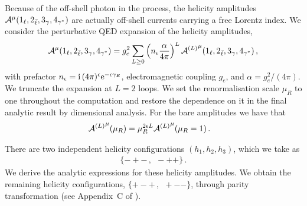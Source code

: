 \documentclass[main.tex]{subfiles}
\begin{document}
Because of the off-shell photon in the process, the helicity amplitudes $\mathcal{A}^{\mu}(1_\ell,2_{\bar\ell},3_\gamma,4_{\gamma^*})$ are actually off-shell currents carrying a free Lorentz index.
We consider the perturbative \ac{QED} expansion of the helicity amplitudes,
\begin{align} \label{eqQED:loopdecomp}
    \mathcal{A}^{\mu}(1_\ell,2_{\bar\ell},3_\gamma,4_{\gamma^*}) = g_e^2 \sum_{L\ge 0} \left( n_\epsilon \frac{\alpha}{4\pi} \right)^L {\mathcal{A}^{(L)}}^{\mu}(1_\ell,2_{\bar\ell},3_\gamma,4_{\gamma^*}) \,,
\end{align}
with prefactor $n_\epsilon=\mathrm{i}\, (4\pi)^\epsilon \mathrm{e}^{-\epsilon\gamma_E}$, electromagnetic coupling $g_e$, and $\alpha=g_e^2/(4\pi)$.
We truncate the expansion at $L=2$ loops.
We set the renormalisation scale $\mu_R$ to one throughout the computation and restore the dependence on it in the final analytic result by dimensional analysis. For the bare amplitudes we have that
\begin{align}
    \label{eqQED:scale-restoration}
    {\mathcal{A}^{(L)}}^{\mu}(\mu_R) &= \mu_R^{2\epsilon L} {\mathcal{A}^{(L)}}^{\mu}(\mu_R=1) \,.
\end{align}

There are two independent helicity configurations $(h_1,h_2,h_3)$, which we take as
\begin{align} \label{eqQED:helconfs}
    \{-+- \,, \ \ -++\} \,.
\end{align}
We derive the analytic expressions for these helicity amplitudes.
We obtain the remaining helicity configurations, $\{+-+ \,,\ \ +--\}$, through parity transformation (see Appendix~C of ).
\end{document}
